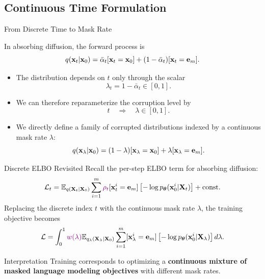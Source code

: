 \documentclass{beamer}
\begin{document}
\subsection{Continuous Time Formulation}
\begin{frame}{From Discrete Time to Mask Rate}

    In absorbing diffusion, the forward process is
    \[
        q(\mathbf{x}_t | \mathbf{x}_0) =
        \bar\alpha_t[\mathbf{x}_t=\mathbf{x}_0]
        +
        (1-\bar\alpha_t)[\mathbf{x}_t=\mathbf{e}_m].
    \]
	\vspace{-0.5cm}
    \eqpause
	\begin{itemize}
		\item The distribution depends on $t$ only through the scalar
		\[
			\lambda_t = 1-\bar\alpha_t \in [0,1].
		\]
		\vspace{-0.5cm}
    	\eqpause
		\item We can therefore reparameterize the corruption level by
		\[
			t \quad \Rightarrow \quad \lambda \in [0,1].
		\]
		\vspace{-0.5cm}
		\eqpause
		\item We directly define a family of corrupted distributions indexed by
		a continuous mask rate $\lambda$:
		\[
			q(\mathbf{x}_\lambda | \mathbf{x}_0) =
			(1-\lambda)[\mathbf{x}_{\lambda}=\mathbf{x}_0]
			+ \lambda[\mathbf{x}_{\lambda}=\mathbf{e}_m].
		\]
	\end{itemize}
\end{frame}
\begin{frame}{Discrete ELBO Revisited}
    Recall the per-step ELBO term for absorbing diffusion:
    \[
        \mathcal{L}_t
        =
        \mathbb{E}_{q(\mathbf{X}_t | \mathbf{X}_0)}
        \sum_{i=1}^m
        {\color{violet}\rho_t}[\mathbf{x}_t^i=\mathbf{e}_m]
        \left[-\log p_{\boldsymbol{\theta}}(\mathbf{x}_0^i | \mathbf{X}_t)\right]
        + \text{const}.
    \]
    \eqpause
    Replacing the discrete index $t$ with the continuous mask rate $\lambda$,
    the training objective becomes
    \[
        \mathcal{L}
        =
        \int_0^1
       {\color{violet} w(\lambda)}
        \mathbb{E}_{q_\lambda(\mathbf{X}_\lambda | \mathbf{X}_0)}
        \sum_{i=1}^m
        [\mathbf{x}_\lambda^i=\mathbf{e}_m]
        \left[-\log p_{\boldsymbol{\theta}}(\mathbf{x}_0^i | \mathbf{X}_\lambda)\right] 
		d\lambda.
    \]
    \eqpause
	\begin{block}{Interpretation}
        Training corresponds to optimizing a \textbf{continuous mixture of
        masked language modeling objectives} with different mask rates.
    \end{block}
\end{frame}
\end{document}
